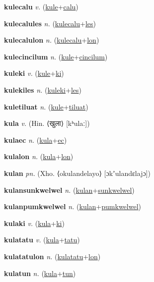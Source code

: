 \textbf{\hypertarget{kulecalu}{kulecalu}} \textit{v.} (\hyperlink{kule}{kule}+\allowbreak \hyperlink{calu}{calu})


\textbf{\hypertarget{kulecalules}{kulecalules}} \textit{n.} (\hyperlink{kulecalu}{kulecalu}+\allowbreak \hyperlink{les}{les})


\textbf{\hypertarget{kulecalulon}{kulecalulon}} \textit{n.} (\hyperlink{kulecalu}{kulecalu}+\allowbreak \hyperlink{lon}{lon})


\textbf{\hypertarget{kulecincilum}{kulecincilum}} \textit{n.} (\hyperlink{kule}{kule}+\allowbreak \hyperlink{cincilum}{cincilum})


\textbf{\hypertarget{kuleki}{kuleki}} \textit{v.} (\hyperlink{kule}{kule}+\allowbreak \hyperlink{ki}{ki})


\textbf{\hypertarget{kulekiles}{kulekiles}} \textit{n.} (\hyperlink{kuleki}{kuleki}+\allowbreak \hyperlink{les}{les})


\textbf{\hypertarget{kuletiluat}{kuletiluat}} \textit{n.} (\hyperlink{kule}{kule}+\allowbreak \hyperlink{tiluat}{tiluat})


\textbf{\hypertarget{kula}{kula}} \textit{v.} (Hin. ⟨{\devanagari{}खुला}⟩ [kʰulaː])


\textbf{\hypertarget{kulaec}{kulaec}} \textit{n.} (\hyperlink{kula}{kula}+\allowbreak \hyperlink{ec}{ec})


\textbf{\hypertarget{kulalon}{kulalon}} \textit{n.} (\hyperlink{kula}{kula}+\allowbreak \hyperlink{lon}{lon})


\textbf{\hypertarget{kulan}{kulan}} \textit{pn.} (Xho. ⟨okulandelayo⟩ [ɔkʼulandɛlajɔ])


\textbf{\hypertarget{kulansunkwelwel}{kulansunkwelwel}} \textit{n.} (\hyperlink{kulan}{kulan}+\allowbreak \hyperlink{sunkwelwel}{sunkwelwel})


\textbf{\hypertarget{kulanpumkwelwel}{kulanpumkwelwel}} \textit{n.} (\hyperlink{kulan}{kulan}+\allowbreak \hyperlink{pumkwelwel}{pumkwelwel})


\textbf{\hypertarget{kulaki}{kulaki}} \textit{v.} (\hyperlink{kula}{kula}+\allowbreak \hyperlink{ki}{ki})


\textbf{\hypertarget{kulatatu}{kulatatu}} \textit{v.} (\hyperlink{kula}{kula}+\allowbreak \hyperlink{tatu}{tatu})


\textbf{\hypertarget{kulatatulon}{kulatatulon}} \textit{n.} (\hyperlink{kulatatu}{kulatatu}+\allowbreak \hyperlink{lon}{lon})


\textbf{\hypertarget{kulatun}{kulatun}} \textit{n.} (\hyperlink{kula}{kula}+\allowbreak \hyperlink{tun}{tun})


